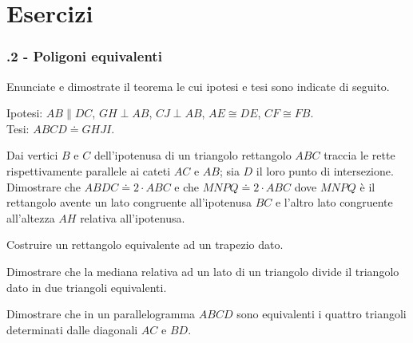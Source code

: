 \section{Esercizi}

\subsubsection*{\thechapter.2 - Poligoni equivalenti}

\begin{multicols}{2}

\begin{esercizio}
\label{ese:7.1}
Enunciate e dimostrate il teorema le cui ipotesi e tesi sono indicate di seguito.

\noindent Ipotesi: $AB\parallel DC$, $GH\perp AB$, $CJ\perp AB$, $AE\cong DE$, $CF\cong FB$.\\
\noindent Tesi: $ABCD\doteq GHJI$.\\

\noindent\centering
\end{esercizio}
 
\begin{esercizio}
\label{ese:7.2}
Dai vertici $B$ e $C$ dell'ipotenusa di un triangolo rettangolo $ABC$ traccia le rette rispettivamente parallele ai cateti $AC$ e $AB$; sia $D$ il loro punto di intersezione. Dimostrare che $ABDC\doteq 2\cdot ABC$ e che $MNPQ\doteq 2\cdot ABC$ dove $MNPQ$ è il rettangolo avente un lato congruente all'ipotenusa $BC$ e l'altro lato congruente all'altezza $AH$ relativa all'ipotenusa.
\end{esercizio}

\begin{esercizio}
\label{ese:7.3}
Costruire un rettangolo equivalente ad un trapezio dato.
\end{esercizio}

\begin{esercizio}
\label{ese:7.4}
Dimostrare che la mediana relativa ad un lato di un triangolo divide il triangolo dato in due triangoli equivalenti.
\end{esercizio}

\begin{esercizio}
\label{ese:7.5}
Dimostrare che in un parallelogramma $ABCD$ sono equivalenti i quattro triangoli determinati dalle diagonali $AC$ e $BD$.
\end{esercizio}


\end{multicols}
